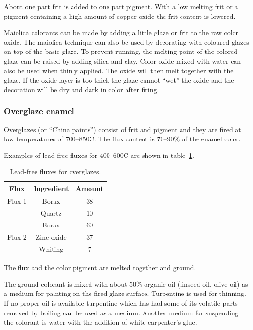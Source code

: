 About one part frit is added to one part pigment. With a low melting frit or a 
pigment containing a high amount of copper oxide the frit content is lowered.

Maiolica colorants can be made by adding a little glaze or frit to the raw 
color oxide. The maiolica technique can also be used by decorating with 
coloured glazes on top of the basic glaze. To prevent running, the melting 
point of the colored glaze can be raised by adding silica and clay. Color oxide 
mixed with water can also be used when thinly applied. The oxide will then melt 
together with the glaze. If the oxide layer is too thick the glaze cannot 
``wet'' the oxide and the decoration will be dry and dark in color after firing.
\subsubsection{Overglaze enamel}
Overglazes (or ``China paints'') consist of frit and pigment and they are fired 
at low temperatures of 700\degree --850\degree C. The flux content is 70--90\% 
of the enamel 
color.

Examples of lead-free fluxes for 400--600\degree C are shown in 
table~\ref{tab:overglazefluxes}.
\begin{center}
  \renewcommand{\arraystretch}{1.5}
  \begin{table}\centering
    \begin{tabular}{|c|c|c|}\hline
      \textbf{Flux}&\textbf{Ingredient}&\textbf{Amount}\\\hline\hline
      Flux 1&Borax&38\\\cline{2-3}
      &Quartz&10\\\hline\hline
      &Borax&60\\\cline{2-3}
Flux 2&Zinc oxide&37\\\cline{2-3}
&Whiting&7\\\hline
    \end{tabular}
    \caption{Lead-free fluxes for overglazes.}
    \label{tab:overglazefluxes}
  \end{table}
\end{center}
The flux and the color pigment are melted together and ground.

The ground colorant is mixed with about 50\% organic oil (linseed oil, olive 
oil) as a medium for painting on the fired glaze surface. Turpentine is used 
for thinning. If no proper oil is available turpentine which has had some of 
its volatile parts removed by boiling can be used as a medium. Another medium 
for suspending the colorant is water with the addition of white carpenter's 
glue.
